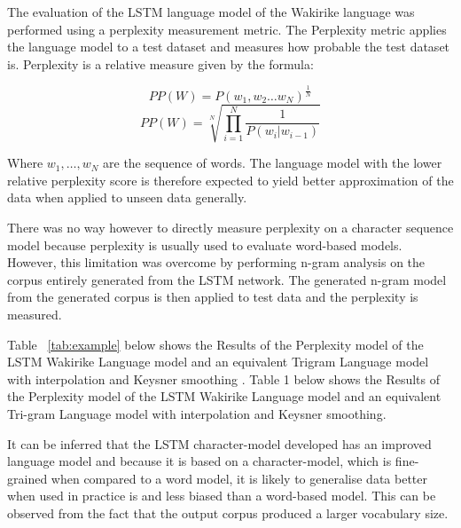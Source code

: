 The evaluation of the LSTM language model of the Wakirike language was performed using a perplexity measurement metric. The Perplexity metric applies the language model to a test dataset and measures how probable the test dataset is. Perplexity is a relative measure given by the formula:

%
\begin{equation}
PP(W)=P(w_1,w_2\dots w_N)^\frac{1}{N}
\label{eq6}
\end{equation}
%
%
\begin{equation}
PP(W)=\sqrt[N]{\prod_{i=1}^N\frac{1}{P(w_i|w_{i-1})}}
\label{eq7}
\end{equation}
%

Where $w_1,\dots,w_N$ are the sequence of words. The language model with the lower relative perplexity score is therefore expected to yield better approximation of the data when applied to unseen data generally.

There was no way however to directly measure perplexity on a character sequence model because perplexity is usually used to evaluate word-based models.  However, this limitation was overcome by performing n-gram analysis on the corpus entirely generated from the LSTM network. The generated n-gram model from the generated corpus is then applied to test data and the perplexity is measured.

Table ~\ref{tab:example} below shows the Results of the Perplexity model of the LSTM Wakirike Language model and an equivalent Trigram Language model with interpolation and Keysner smoothing \cite{chen1996empirical}.
Table 1 below shows the Results of the Perplexity model of the LSTM Wakirike Language model and an equivalent Tri-gram Language model with interpolation and Keysner smoothing.

It can be inferred that the LSTM character-model developed has an improved language model and because it is based on a character-model, which is fine-grained when compared to a word model, it is likely to generalise data better when used in practice is and less biased than a word-based model.  This can be observed from the fact that the output corpus produced a larger vocabulary size.
